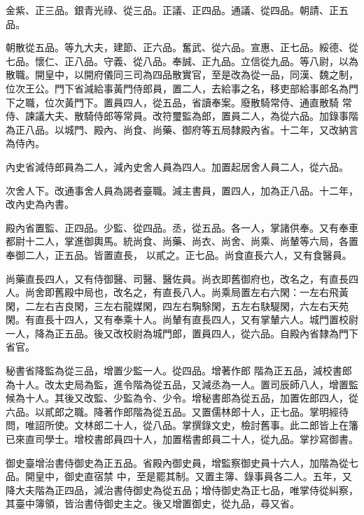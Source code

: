\begin{pinyinscope}
 金紫、正三品。銀青光祿、從三品。正議、正四品。通議、從四品。朝請、正五品。



 朝散從五品。等九大夫，建節、正六品。奮武、從六品。宣惠、正七品。綏德、從七品。懷仁、正八品。守義、從八品。奉誠、正九品。立信從九品。等八尉，以為散職。開皇中，以開府儀同三司為四品散實官，至是改為從一品，同漢、魏之制，位次王公。門下省減給事黃門侍郎員，置二人，去給事之名，移吏部給事郎名為門下之職，位次黃門下。置員四人，從五品，省讀奉案。廢散騎常侍、通直散騎
 常侍、諫議大夫、散騎侍郎等常員。改符璽監為郎，置員二人，為從六品。加錄事階為正八品。以城門、殿內、尚食、尚藥、御府等五局隸殿內省。十二年，又改納言為侍內。



 內史省減侍郎員為二人，減內史舍人員為四人。加置起居舍人員二人，從六品。



 次舍人下。改通事舍人員為謁者臺職。減主書員，置四人，加為正八品。十二年，改內史為內書。



 殿內省置監、正四品。少監、從四品。丞，從五品。各一人，掌諸供奉。又有奉車都尉十二人，掌進御輿馬。統尚食、尚藥、尚衣、尚舍、尚乘、尚輦等六局，各置奉御二人，正五品。皆置直長，
 以貳之。正七品。尚食直長六人，又有食醫員。



 尚藥直長四人，又有侍御醫、司醫、醫佐員。尚衣即舊御府也，改名之，有直長四人。尚舍即舊殿中局也，改名之，有直長八人。尚乘局置左右六閑：一左右飛黃閑，二左右吉良閑，三左右龍媒閑，四左右騊駼閑，五左右駃騠閑，六左右天苑閑。有直長十四人，又有奉乘十人。尚輦有直長四人，又有掌輦六人。城門置校尉一人，降為正五品。後又改校尉為城門郎，置員四人，從六品。自殿內省隸為門下省官。



 秘書省降監為從三品，增置少監一人。從四品。增著作郎
 階為正五品，減校書郎為十人。改太史局為監，進令階為從五品，又減丞為一人。置司辰師八人，增置監候為十人。其後又改監、少監為令、少令。增秘書郎為從五品，加置佐郎四人，從六品。以貳郎之職。降著作郎階為從五品。又置儒林郎十人，正七品。掌明經待問，唯詔所使。文林郎二十人，從八品。掌撰錄文史，檢討舊事。此二郎皆上在籓已來直司學士。增校書郎員四十人，加置楷書郎員二十人，從九品。掌抄寫御書。



 御史臺增治書侍御史為正五品。省殿內御史員，增監察御史員十六人，加階為從七品。開皇中，御史直宿禁
 中，至是罷其制。又置主簿、錄事員各二人。五年，又降大夫階為正四品，減治書侍御史為從五品；增侍御史為正七品，唯掌侍從糾察，其臺中簿領，皆治書侍御史主之。後又增置御史，從九品，尋又省。




\end{pinyinscope}
